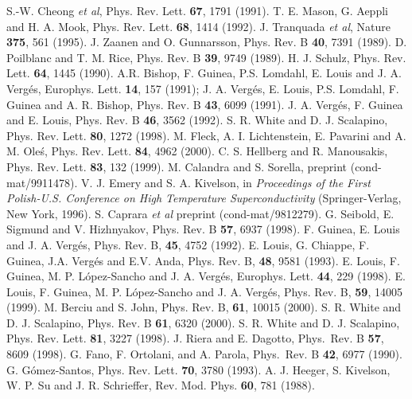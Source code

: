 \begin{thebibliography}{}
S.-W. Cheong {\it et al}, Phys. Rev. Lett.
{\bf 67}, 1791 (1991).
T. E. Mason, G. Aeppli and H. A. Mook, Phys. Rev. Lett.
{\bf 68}, 1414 (1992).
J. Tranquada {\it et al}, Nature {\bf 375}, 561 (1995).
J. Zaanen and O. Gunnarsson, Phys. Rev. B {\bf 40}, 7391 (1989).
D. Poilblanc and T. M. Rice, Phys. Rev. B {\bf 39}, 9749 (1989).
H. J. Schulz, Phys. Rev. Lett. {\bf 64}, 1445 (1990). 
A.R. Bishop, F. Guinea, P.S. Lomdahl, E. Louis and J. A. Verg\'es,
Europhys. Lett. {\bf 14}, 157 (1991);
J. A. Verg\'es, E. Louis, P.S. Lomdahl, F. Guinea and A. R. Bishop,
Phys. Rev. B {\bf 43}, 6099 (1991).
J. A. Verg\'es, F. Guinea and E. Louis, 
Phys. Rev. B {\bf 46}, 3562 (1992).
S. R. White and D. J. Scalapino, Phys. Rev. Lett.
{\bf 80}, 1272 (1998).
M. Fleck, A. I. Lichtenstein, E. Pavarini and A. M. Ole\'s,
Phys. Rev. Lett. {\bf 84}, 4962 (2000).
C. S. Hellberg and R. Manousakis, Phys. Rev. Lett.
{\bf 83}, 132 (1999).
M. Calandra and S. Sorella, preprint (cond-mat/9911478).
V. J. Emery and S. A. Kivelson, in {\sl Proceedings of the
First Polish-U.S. Conference on High Temperature Superconductivity}
(Springer-Verlag, New York, 1996).
S. Caprara {\it et al} preprint (cond-mat/9812279).
G. Seibold, E. Sigmund and V. Hizhnyakov, Phys. Rev. B
{\bf 57}, 6937 (1998).
F. Guinea, E. Louis and J. A. Verg\'es, Phys. Rev. B,
{\bf 45}, 4752 (1992).
E. Louis, G. Chiappe, F. Guinea, J.A. Verg\'es and E.V. Anda, Phys. Rev. B,
{\bf 48}, 9581 (1993).
E. Louis, F. Guinea, M. P. L\'opez-Sancho and J. A. Verg\'es,
Europhys. Lett. {\bf 44}, 229 (1998).
E. Louis, F. Guinea, M. P. L\'opez-Sancho and J. A. Verg\'es,
Phys. Rev. B, {\bf 59}, 14005 (1999).
M. Berciu and S. John, Phys. Rev. B, {\bf 61}, 10015 (2000). 
S. R. White and D. J. Scalapino, Phys. Rev. B {\bf 61}, 6320 (2000).
S. R. White and D. J. Scalapino, Phys. Rev. Lett. {\bf 81}, 3227 (1998).
J. Riera and E. Dagotto,
Phys.\ Rev. B {\bf 57}, 8609 (1998).
G. Fano, F. Ortolani, and A. Parola,
Phys.\ Rev. B {\bf 42}, 6977 (1990).
G. G\'omez-Santos, Phys. Rev. Lett. {\bf 70}, 3780 (1993).
A. J. Heeger, S. Kivelson, W. P. Su and J. R. Schrieffer,
Rev. Mod. Phys. {\bf 60}, 781 (1988).

\end{thebibliography}
